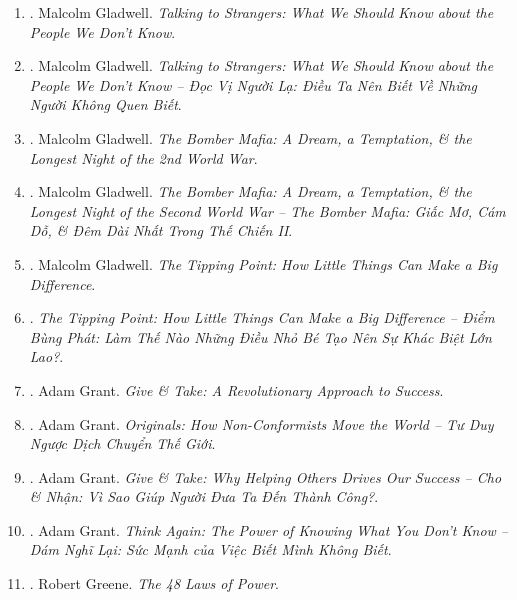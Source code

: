 \documentclass{article}
\begin{document}
\begin{enumerate}
	\item \cite{Gladwell2019}. Malcolm Gladwell. {\it Talking to Strangers: What We Should Know about the People We Don't Know}.\hfill{\sf[reading]}
	
	\item \cite{Gladwell_stranger}. Malcolm Gladwell. {\it Talking to Strangers: What We Should Know about the People We Don't Know -- Đọc Vị Người Lạ: Điều Ta Nên Biết Về Những Người Không Quen Biết}.\hfill{\sf[done]}
	
	\item \cite{Gladwell2021}. Malcolm Gladwell. {\it The Bomber Mafia: A Dream, a Temptation, \& the Longest Night of the 2nd World War}.\hfill{\sf[reading]}
	
	\item \cite{Gladwell_bomber_mafia}. Malcolm Gladwell. {\it The Bomber Mafia: A Dream, a Temptation, \& the Longest Night of the Second World War -- The Bomber Mafia: Giấc Mơ, Cám Dỗ, \& Đêm Dài Nhất Trong Thế Chiến II}.\hfill{\sf[done]}
	
	\item \cite{Gladwell2022}. Malcolm Gladwell. {\it The Tipping Point: How Little Things Can Make a Big Difference}.\hfill{\sf[reading]}
	
	\item \cite{Gladwell_tipping_point}. {\it The Tipping Point: How Little Things Can Make a Big Difference -- Điểm Bùng Phát: Làm Thế Nào Những Điều Nhỏ Bé Tạo Nên Sự Khác Biệt Lớn Lao?}.\hfill{\sf[done]}
	
	\item \cite{Grant_give_take}. {\sc Adam Grant}. {\it Give \& Take: A Revolutionary Approach to Success}.\hfill{\sf[reading]}
	
	\item \cite{Grant2020}. Adam Grant. {\it Originals: How Non-Conformists Move the World -- Tư Duy Ngược Dịch Chuyển Thế Giới}.\hfill{\sf[done]}
	
	\item \cite{Grant_give_take_VN}. Adam Grant. {\it Give \& Take: Why Helping Others Drives Our Success -- Cho \& Nhận: Vì Sao Giúp Người Đưa Ta Đến Thành Công?}.\hfill{\sf[done]}
	
	\item \cite{Grant2022b}. Adam Grant. {\it Think Again: The Power of Knowing What You Don't Know -- Dám Nghĩ Lại: Sức Mạnh của Việc Biết Mình Không Biết}.\hfill{\sf[done]}
	
	\item \cite{Greene_laws_power}. {\sc Robert Greene}. {\it The 48 Laws of Power}. {}
	

\end{enumerate}
\end{document}
